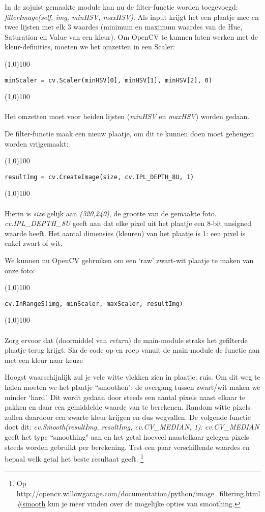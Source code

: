 \documentclass[a4paper]{article}
\begin{document}
In de zojuist gemaakte module kan nu de filter-functie worden toegevoegd: \textit{filterImage(self, img, minHSV, maxHSV)}.
Als input krijgt het een plaatje mee en twee lijsten met elk 3 waardes (minimum en maximum waardes van de Hue, Saturation en Value van een kleur).
Om OpenCV te kunnen laten werken met de kleur-definities, moeten we het omzetten in een Scaler:

\noindent \line(1,0){100}
\begin{verbatim}
minScaler = cv.Scaler(minHSV[0], minHSV[1], minHSV[2], 0)
\end{verbatim}
\noindent \line(1,0){100}
\\\\
Het omzetten moet voor beiden lijsten (\textit{minHSV} en \textit{maxHSV}) worden gedaan.

De filter-functie maak een nieuw plaatje, om dit te kunnen doen moet geheugen worden vrijgemaakt:

\noindent \line(1,0){100}
\begin{verbatim}
resultImg = cv.CreateImage(size, cv.IPL_DEPTH_8U, 1)
\end{verbatim}
\noindent \line(1,0){100}
\\\\
Hierin is \textit{size} gelijk aan \textit{(320,240)}, de grootte van de gemaakte foto. \textit{cv.IPL\_DEPTH\_8U} geeft aan dat elke pixel uit het plaatje een 8-bit unsigned waarde heeft. Het aantal dimensies (kleuren) van het plaatje is 1: een pixel is enkel zwart of wit.

We kunnen nu OpenCV gebruiken om een `raw' zwart-wit plaatje te maken van onze foto:

\noindent \line(1,0){100}
\begin{verbatim}
cv.InRangeS(img, minScaler, maxScaler, resultImg)
\end{verbatim}
\noindent \line(1,0){100}
\\\\
Zorg ervoor dat (doormiddel van \textit{return}) de main-module straks het gefilterde plaatje terug krijgt.
Sla de code op en roep vanuit de main-module de functie aan met een kleur naar keuze

Hoogst waarschijnlijk zul je vele witte vlekken zien in plaatje: ruis. Om dit weg te halen moeten we het plaatje ``smoothen": de overgang tussen zwart/wit maken we minder `hard'. Dit wordt gedaan door steeds een aantal pixels naast elkaar te pakken en daar een gemiddelde waarde van te berekenen. Random witte pixels zullen daardoor een zwarte kleur krijgen en dus wegvallen. De volgende functie doet dit: \textit{cv.Smooth(resultImg, resultImg, cv.CV\_MEDIAN, 1)}. \textit{cv.CV\_MEDIAN} geeft het type ``smoothing" aan en het getal hoeveel naastelkaar gelegen pixels steeds worden gebruikt per berekening. Test een paar verschillende waardes en bepaal welk getal het beste resultaat geeft. \footnote{Op \url{http://opencv.willowgarage.com/documentation/python/image_filtering.html\#smooth} kun je meer vinden over de mogelijke opties van smoothing.}
\end{document}
